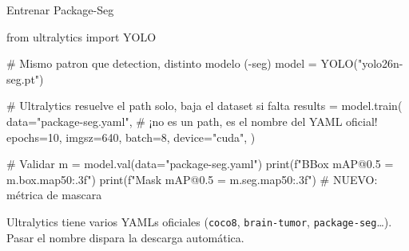 \begin{frame}{Entrenar Package-Seg}
  \vspace{-4pt}
  \begin{pyblock}
from ultralytics import YOLO

# Mismo patron que detection, distinto modelo (-seg)
model = YOLO("yolo26n-seg.pt")

# Ultralytics resuelve el path solo, baja el dataset si falta
results = model.train(
    data="package-seg.yaml",   # ¡no es un path, es el nombre del YAML oficial!
    epochs=10,
    imgsz=640,
    batch=8,
    device="cuda",
)

# Validar
m = model.val(data="package-seg.yaml")
print(f"BBox mAP@0.5  = {m.box.map50:.3f}")
print(f"Mask mAP@0.5  = {m.seg.map50:.3f}")   # NUEVO: m\'etrica de mascara
  \end{pyblock}

  \vspace{4pt}
  {\scriptsize\color{textMuted}
    \faLightbulb\hspace{4pt} Ultralytics tiene varios YAMLs oficiales
    (\texttt{coco8}, \texttt{brain-tumor}, \texttt{package-seg}\ldots).
    Pasar el nombre dispara la descarga autom\'atica.}
\end{frame}


